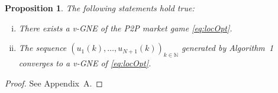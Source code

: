 \documentclass{IEEEtran}  %
\newtheorem{proposition}{Proposition}
\newcommand{\bb}{\mathbb}
\newcommand{\0}{\mathbf{0}}
\newcommand{\1}{\mathbf{1}}
\begin{document}
\smallskip
\begin{proposition} The following statements hold true:\hspace*{3em}
	\label{prp:conv}
\begin{enumerate}[(i)]
\item There exists a v-GNE of the P2P market game \eqref{eq:locOpt}.
\item The sequence $\left(u_1(k),\ldots,u_{N+1}(k)\right)_{k \in \bb N}$ generated by Algorithm~1 converges to a v-GNE of \eqref{eq:locOpt}.
\end{enumerate}
\end{proposition}
\begin{proof} See Appendix~A.
\end{proof}
\end{document}
